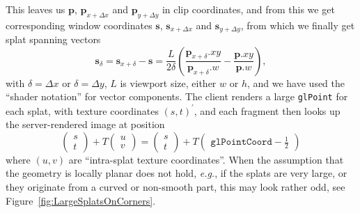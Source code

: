 \documentclass[10pt,conference,compsocconf]{IEEEtran}
\newcommand{\pv}{\mathbf{p}}
\newcommand{\sv}{\mathbf{s}}
\newcommand{\eg}{{\em e.g.}}
\begin{document}
This leaves us $\pv$, $\pv_{x+\Delta x}$ and $\pv_{y+\Delta y}$ in clip
coordinates, and from this we get
corresponding window coordinates $\sv$, $\sv_{x+\Delta x}$ and $\sv_{y+\Delta
y}$, from which we finally get splat spanning vectors
\[
  \sv_{\delta} =
  \sv_{x+\delta} - \sv =
    \frac{L}{2\delta} \left(
        \frac{\pv_{x+\delta}.xy}{\pv_{x+\delta}.w} -
        \frac{\pv.xy}{\pv.w}
    \right),
\]
with $\delta=\Delta x$ or $\delta=\Delta y$, $L$ is viewport size, either $w$ or
$h$, and we have used the ``shader notation'' for vector components.  The client
renders a large \texttt{glPoint} for each splat, with texture coordinates $(s,
t)^\prime$, and each fragment then looks up the server-rendered image at
position
\[
  \begin{pmatrix}
    s \\ t
  \end{pmatrix} +
  T 
  \begin{pmatrix}
    u \\ v
  \end{pmatrix}
  =
  \begin{pmatrix}
    s \\ t
  \end{pmatrix} +
  T 
  \begin{pmatrix}
    \texttt{glPointCoord}-\frac{1}{2}
  \end{pmatrix}
\]
where $(u, v)$ are ``intra-splat texture coordinates''.  When the assumption
that the geometry is locally planar does not hold, \eg, if the splats are very
large, or they originate from a curved or non-smooth part, this may look rather
odd, see Figure~\ref{fig:LargeSplatsOnCorners}.
\end{document}
